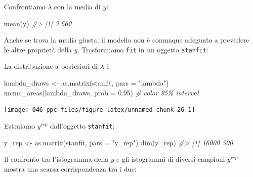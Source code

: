 \documentclass[
  11pt,
  italian,
  a4paper,
  extrafontsizes,onecolumn,openright
  ]{memoir}
\newenvironment{Shaded}{\begin{snugshade}}{\end{snugshade}}
\newcommand{\AttributeTok}[1]{\textcolor[rgb]{0.77,0.63,0.00}{#1}}
\newcommand{\CommentTok}[1]{\textcolor[rgb]{0.56,0.35,0.01}{\textit{#1}}}
\newcommand{\FloatTok}[1]{\textcolor[rgb]{0.00,0.00,0.81}{#1}}
\newcommand{\FunctionTok}[1]{\textcolor[rgb]{0.00,0.00,0.00}{#1}}
\newcommand{\NormalTok}[1]{#1}
\newcommand{\OtherTok}[1]{\textcolor[rgb]{0.56,0.35,0.01}{#1}}
\newcommand{\SpecialCharTok}[1]{\textcolor[rgb]{0.00,0.00,0.00}{#1}}
\newcommand{\StringTok}[1]{\textcolor[rgb]{0.31,0.60,0.02}{#1}}
\theoremstyle{definition}
\theoremstyle{definition}
\theoremstyle{definition}
\theoremstyle{definition}
\theoremstyle{remark}
\begin{document}
\noindent
Confrontiamo \(\lambda\) con la media di \(y\):

\begin{Shaded}
\begin{Highlighting}[]
\FunctionTok{mean}\NormalTok{(y)}
\CommentTok{\#\textgreater{} [1] 3.662}
\end{Highlighting}
\end{Shaded}

Anche se trova la media giusta, il modello non è comunque adeguato a prevedere le altre proprietà della \(y\). Trasformiamo \texttt{fit} in un oggetto \texttt{stanfit}:

\begin{Shaded}
\end{Shaded}

\noindent
La distribuzione a posteriori di \(\lambda\) è

\begin{Shaded}
\begin{Highlighting}[]
\NormalTok{lambda\_draws }\OtherTok{\textless{}{-}} \FunctionTok{as.matrix}\NormalTok{(stanfit, }\AttributeTok{pars =} \StringTok{"lambda"}\NormalTok{)}
\FunctionTok{mcmc\_areas}\NormalTok{(lambda\_draws, }\AttributeTok{prob =} \FloatTok{0.95}\NormalTok{) }\CommentTok{\# color 95\% interval}
\end{Highlighting}
\end{Shaded}

\begin{center}\texttt{[image: 046\_ppc\_files/figure-latex/unnamed-chunk-26-1]} \end{center}

\noindent
Estraiamo \(y^{rep}\) dall'oggetto \texttt{stanfit}:

\begin{Shaded}
\begin{Highlighting}[]
\NormalTok{y\_rep }\OtherTok{\textless{}{-}} \FunctionTok{as.matrix}\NormalTok{(stanfit, }\AttributeTok{pars =} \StringTok{"y\_rep"}\NormalTok{)}
\FunctionTok{dim}\NormalTok{(y\_rep)}
\CommentTok{\#\textgreater{} [1] 16000   500}
\end{Highlighting}
\end{Shaded}

Il confronto tra l'istogramma della \(y\) e gli istogrammi di diversi campioni \(y^{rep}\) mostra una scarsa corrispondenza tra i due:
\end{document}
